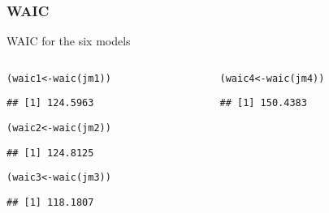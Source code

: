 \documentclass[color=usenames,dvipsnames]{beamer}\usepackage[]{graphicx}\usepackage[]{xcolor}
\makeatletter
\newcommand{\hldef}[1]{\textcolor[rgb]{0,0,0}{#1}}%
\newcommand{\hlkwb}[1]{\textcolor[rgb]{0,0.341,0.682}{#1}}%
\newcommand{\hlkwd}[1]{\textcolor[rgb]{0.004,0.004,0.506}{#1}}%
\newenvironment{kframe}{%
 \def\at@end@of@kframe{}%
 \ifinner\ifhmode%
  \def\at@end@of@kframe{\end{minipage}}%
  \begin{minipage}{\columnwidth}%
 \fi\fi%
 \def\FrameCommand##1{\hskip\@totalleftmargin \hskip-\fboxsep
 \colorbox{shadecolor}{##1}\hskip-\fboxsep
     \hskip-\linewidth \hskip-\@totalleftmargin \hskip\columnwidth}%
 \MakeFramed {\advance\hsize-\width
   \@totalleftmargin\z@ \linewidth\hsize
   \@setminipage}}%
 {\par\unskip\endMakeFramed%
 \at@end@of@kframe}
\newenvironment{knitrout}{}{} %
\makeatother
\begin{document}
\begin{frame}[fragile]
  \frametitle{WAIC}
  WAIC for the six models
  \begin{columns}
    \begin{column}{0.5\textwidth}
\begin{knitrout}\scriptsize
{}\color{fgcolor}\begin{kframe}
\begin{alltt}
\hldef{(waic1} \hlkwb{<-} \hlkwd{waic}\hldef{(jm1))}
\end{alltt}
\begin{verbatim}
## [1] 124.5963
\end{verbatim}
\end{kframe}
\end{knitrout}
\begin{knitrout}\scriptsize
{}\color{fgcolor}\begin{kframe}
\begin{alltt}
\hldef{(waic2} \hlkwb{<-} \hlkwd{waic}\hldef{(jm2))}
\end{alltt}
\begin{verbatim}
## [1] 124.8125
\end{verbatim}
\end{kframe}
\end{knitrout}
\begin{knitrout}\scriptsize
{}\color{fgcolor}\begin{kframe}
\begin{alltt}
\hldef{(waic3} \hlkwb{<-} \hlkwd{waic}\hldef{(jm3))}
\end{alltt}
\begin{verbatim}
## [1] 118.1807
\end{verbatim}
\end{kframe}
\end{knitrout}
    \end{column}
    \begin{column}{0.5\textwidth}
\begin{knitrout}\scriptsize
{}\color{fgcolor}\begin{kframe}
\begin{alltt}
\hldef{(waic4} \hlkwb{<-} \hlkwd{waic}\hldef{(jm4))}
\end{alltt}
\begin{verbatim}
## [1] 150.4383
\end{verbatim}
\end{kframe}

\end{knitrout}
\end{column}
\end{columns}
\end{frame}
\end{document}
